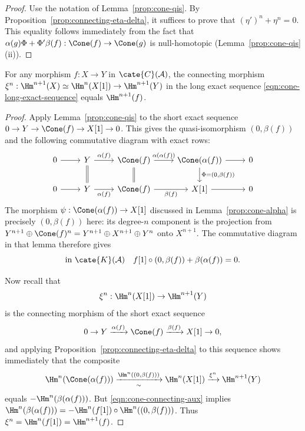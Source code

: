 \begin{proof}
	Use the notation of Lemma~\ref{prop:cone-qis}. By
	Proposition~\ref{prop:connecting-eta-delta}, it suffices to prove that
	$(\eta')^n+\eta^n=0$. This equality follows immediately from the fact
	that $\alpha(g)\Phi+\Phi'\beta(f):\Cone(f)\to\Cone(g)$ is null-homotopic
	(Lemma~\ref{prop:cone-qis} (ii)).
\end{proof}

\begin{corollary}\label{prop:cone-connecting}
	For any morphism $f:X\to Y$ in $\cate{C}(\mathcal{A})$, the connecting
	morphism $\xi^n:\Hm^{n+1}(X)\simeq\Hm^n(X[1])\to\Hm^{n+1}(Y)$ in the
	long exact sequence \eqref{eqn:cone-long-exact-sequence} equals
	$\Hm^{n+1}(f)$.
\end{corollary}

\begin{proof}
	Apply Lemma~\ref{prop:cone-qis} to the short exact sequence
	$0\to Y\to\Cone(f)\to X[1]\to0$. This gives the quasi-isomorphism
	$(0,\beta(f))$ and the following commutative diagram with exact rows:
	\[\begin{tikzcd}
		0 \arrow[r] & Y \arrow[r, "\alpha(f)"] & \Cone(f) \arrow[r, "{\alpha(\alpha(f))}"] & \Cone(\alpha(f)) \arrow[d, "{\Phi = (0, \beta(f))}"] \arrow[r] & 0 \\
		0 \arrow[r] & Y \arrow[r, "\alpha(f)"'] \arrow[equal, u] & \Cone(f) \arrow[r, "\beta(f)"'] \arrow[equal, u] & X[1] \arrow[r] & 0
	\end{tikzcd}\]
	The morphism $\psi:\Cone(\alpha(f))\to X[1]$ discussed in
	Lemma~\ref{prop:cone-alpha} is precisely $(0,\beta(f))$ here: its
	degree-$n$ component is the projection from
	$Y^{n+1}\oplus\Cone(f)^n=Y^{n+1}\oplus X^{n+1}\oplus Y^n$ onto
	$X^{n+1}$. The commutative diagram in that lemma therefore gives
	\begin{equation}\label{eqn:cone-connecting-aux}
		\text{in $\cate{K}(\mathcal{A})$} \quad f[1] \circ (0, \beta(f)) + \beta(\alpha(f)) = 0 .
	\end{equation}

	Now recall that
	\[
		\xi^n:\Hm^n(X[1])\to\Hm^{n+1}(Y)
	\]
	is the connecting morphism of the short exact sequence
	\[ 0 \to Y \xrightarrow{\alpha(f)} \Cone(f) \xrightarrow{\beta(f)} X[1] \to 0, \]
	and applying Proposition~\ref{prop:connecting-eta-delta} to this sequence
	shows immediately that the composite
	\[ \Hm^n(\Cone(\alpha(f))) \xrightarrow[\sim]{\Hm^n((0, \beta(f)))} \Hm^n(X[1]) \xrightarrow{\xi^n} \Hm^{n+1}(Y) \]
	equals $-\Hm^n(\beta(\alpha(f)))$. But
	\eqref{eqn:cone-connecting-aux} implies
	$\Hm^n(\beta(\alpha(f)))=-\Hm^n(f[1])\circ
	\Hm^n((0,\beta(f)))$. Thus
	$\xi^n=\Hm^n(f[1])=\Hm^{n+1}(f)$.
\end{proof}

